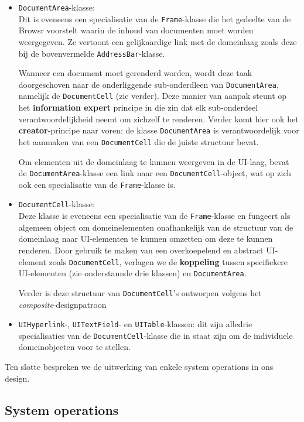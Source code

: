 \documentclass[12pt]{article}
\begin{document}
\begin{itemize}
	 \item \texttt{DocumentArea}-klasse:\\
	 Dit is eveneens een specialisatie van de \texttt{Frame}-klasse die het gedeelte van de Browsr voorstelt waarin de inhoud van documenten moet worden weergegeven. Ze vertoont een gelijkaardige link met de domeinlaag zoals deze bij de bovenvermelde \texttt{AddressBar}-klasse.
	 
	 Wanneer een document moet gerenderd worden, wordt deze taak doorgeschoven naar de onderliggende sub-onderdleen van \texttt{DocumentArea}, namelijk de \texttt{DocumentCell} (zie verder). Deze manier van aanpak steunt op het \textbf{information expert} principe in die zin dat elk sub-onderdeel verantwoordelijkheid neemt om zichzelf te renderen. Verder komt hier ook het \textbf{creator}-principe naar voren: de klasse \texttt{DocumentArea} is verantwoordelijk voor het aanmaken van een \texttt{DocumentCell} die de juiste structuur bevat.
	 
	 Om elementen uit de domeinlaag te kunnen weergeven in de UI-laag, bevat de \texttt{DocumentArea}-klasse een link naar een \texttt{DocumentCell}-object, wat op zich ook een specialisatie van de \texttt{Frame}-klasse is.
	 
	 \item \texttt{DocumentCell}-klasse:\\
	 Deze klasse is eveneens een specialisatie van de \texttt{Frame}-klasse en fungeert als algemeen object om domeinelementen onafhankelijk van de structuur van de domeinlaag naar UI-elementen te kunnen omzetten om deze te kunnen renderen. Door gebruik te maken van een overkoepelend en abstract UI-element zoals \texttt{DocumentCell}, verlagen we de \textbf{koppeling} tussen specifiekere UI-elementen (zie onderstannde drie klassen) en \texttt{DocumentArea}.
	 
	 Verder is deze structuur van \texttt{DocumentCell}'s ontworpen volgens het \textit{composite}-designpatroon
	 
	 \item \texttt{UIHyperlink}\label{UIHyperlink1}-, \texttt{UITextField}- en \texttt{UITable}-klassen:
	 dit zijn alledrie specialisaties van de \texttt{DocumentCell}-klasse die in staat zijn om de individuele domeinobjecten voor te stellen. 
 \end{itemize}

Ten slotte bespreken we de uitwerking van enkele system operations in ons design.

\subsection{System operations}
\end{document}
